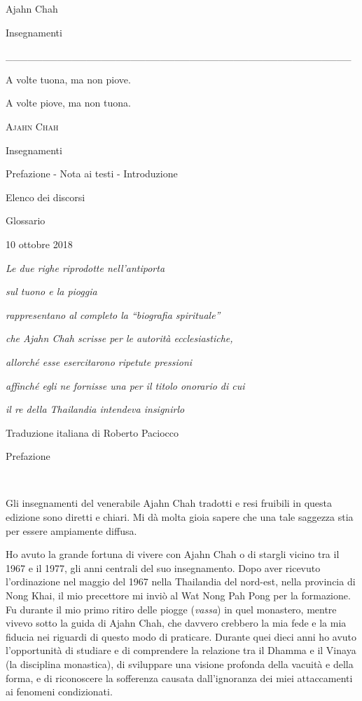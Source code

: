 Ajahn Chah

Insegnamenti

\_\_\_\_\_\_\_\_\_\_\_\_\_\_\_\_\_\_\_\_\_\_\_\_\_\_\_\_\_\_\_\_\_\_\_\_\_\_\_\_\_\_\_\_\_\_\_

A volte tuona, ma non piove.

A volte piove, ma non tuona.

\textsc{Ajahn Chah}

Insegnamenti

Prefazione - Nota ai testi - Introduzione

Elenco dei discorsi

Glossario

10 ottobre 2018

\emph{Le due righe riprodotte nell'antiporta }

\emph{sul tuono e la pioggia }

\emph{rappresentano al completo la ``biografia spirituale''}

\emph{che Ajahn Chah scrisse per le autorità ecclesiastiche,}

\emph{allorché esse esercitarono ripetute pressioni }

\emph{affinché egli ne fornisse una per il titolo onorario di cui }

\emph{il re della Thailandia intendeva insignirlo}

Traduzione italiana di Roberto Paciocco

Prefazione



Gli insegnamenti del venerabile Ajahn Chah tradotti e resi fruibili in
questa edizione sono diretti e chiari. Mi dà molta gioia sapere che una
tale saggezza stia per essere ampiamente diffusa.

Ho avuto la grande fortuna di vivere con Ajahn Chah o di stargli vicino
tra il 1967 e il 1977, gli anni centrali del suo insegnamento. Dopo aver
ricevuto l'ordinazione nel maggio del 1967 nella Thailandia del
nord-est, nella provincia di Nong Khai, il mio precettore mi inviò al
Wat Nong Pah Pong per la formazione. Fu durante il mio primo ritiro
delle piogge (\emph{vassa}) in quel monastero, mentre vivevo sotto la
guida di Ajahn Chah, che davvero crebbero la mia fede e la mia fiducia
nei riguardi di questo modo di praticare. Durante quei dieci anni ho
avuto l'opportunità di studiare e di comprendere la relazione tra il
Dhamma e il Vinaya (la disciplina monastica), di sviluppare una visione
profonda della vacuità e della forma, e di riconoscere la sofferenza
causata dall'ignoranza dei miei attaccamenti ai fenomeni condizionati.

